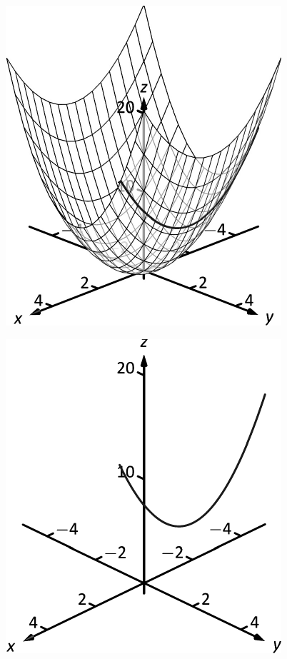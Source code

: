 \documentclass[10pt]{article}
\begin{document}
\includegraphics{figpartialintro_3DBW.pdf}
\texttt{}

\includegraphics{figpartialintrob_3DBW.pdf}
\texttt{}
\end{document}
